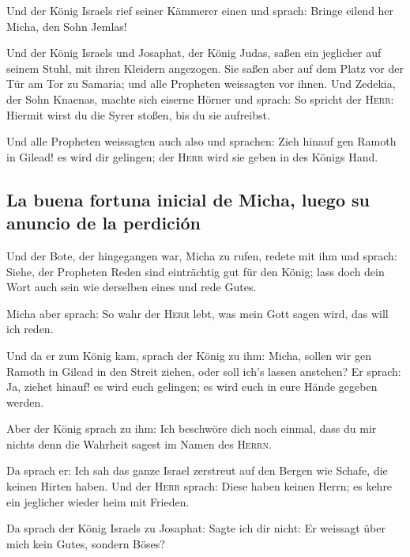  Und der König Israels rief seiner Kämmerer einen und
sprach: Bringe eilend her Micha, den Sohn Jemlas!

 Und der König Israels und Josaphat, der König Judas,
saßen ein jeglicher auf seinem Stuhl, mit ihren Kleidern angezogen. Sie
saßen aber auf dem Platz vor der Tür am Tor zu Samaria; und alle
Propheten weissagten vor ihnen.  Und Zedekia, der Sohn
Knaenas, machte sich eiserne Hörner und sprach: So spricht der
\textsc{Herr}: Hiermit wirst du die Syrer stoßen, bis du sie aufreibst.

 Und alle Propheten weissagten auch also und sprachen:
Zieh hinauf gen Ramoth in Gilead! es wird dir gelingen; der
\textsc{Herr} wird sie geben in des Königs Hand.

\hypertarget{la-buena-fortuna-inicial-de-micha-luego-su-anuncio-de-la-perdiciuxf3n}{%
\subsection{La buena fortuna inicial de Micha, luego su anuncio de la
perdición}\label{la-buena-fortuna-inicial-de-micha-luego-su-anuncio-de-la-perdiciuxf3n}}

 Und der Bote, der hingegangen war, Micha zu rufen,
redete mit ihm und sprach: Siehe, der Propheten Reden sind einträchtig
gut für den König; lass doch dein Wort auch sein wie derselben eines und
rede Gutes.

 Micha aber sprach: So wahr der \textsc{Herr} lebt, was
mein Gott sagen wird, das will ich reden.

 Und da er zum König kam, sprach der König zu ihm: Micha,
sollen wir gen Ramoth in Gilead in den Streit ziehen, oder soll ich's
lassen anstehen? Er sprach: Ja, ziehet hinauf! es wird euch gelingen; es
wird euch in eure Hände gegeben werden.

 Aber der König sprach zu ihm: Ich beschwöre dich noch
einmal, dass du mir nichts denn die Wahrheit sagest im Namen des
\textsc{Herrn}.

 Da sprach er: Ich sah das ganze Israel zerstreut auf den
Bergen wie Schafe, die keinen Hirten haben. Und der \textsc{Herr}
sprach: Diese haben keinen Herrn; es kehre ein jeglicher wieder heim mit
Frieden.

 Da sprach der König Israels zu Josaphat: Sagte ich dir
nicht: Er weissagt über mich kein Gutes, sondern Böses?

